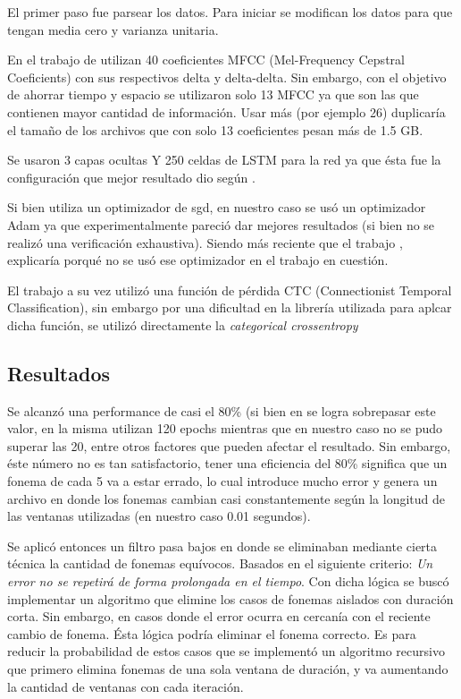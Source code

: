 \documentclass{article}
\begin{document}
El primer paso fue parsear los datos. Para iniciar se modifican los datos para que tengan media cero y varianza unitaria.

En el trabajo de \cite{RNN_HINTON} utilizan 40 coeficientes MFCC (Mel-Frequency Cepstral Coeficients) con sus respectivos delta y delta-delta. Sin embargo, con el objetivo de ahorrar tiempo y espacio se utilizaron solo 13 MFCC ya que son las que contienen mayor cantidad de información. Usar más (por ejemplo 26) duplicaría el tamaño de los archivos que con solo 13 coeficientes pesan más de 1.5 GB. 

Se usaron 3 capas ocultas Y 250 celdas de LSTM para la red ya que ésta fue la configuración que mejor resultado dio según \cite{RNN_HINTON}. 

Si bien \cite{RNN_HINTON} utiliza un optimizador de sgd, en nuestro caso se usó un optimizador Adam \cite{ADAM} ya que  experimentalmente pareció dar mejores resultados (si bien no se realizó una verificación exhaustiva). Siendo \cite{ADAM} más reciente que el trabajo \cite{RNN_HINTON}, explicaría porqué no se usó ese optimizador en el trabajo en cuestión. 

El trabajo a su vez utilizó una función de pérdida CTC (Connectionist Temporal Classification), sin embargo por una dificultad en la librería utilizada para aplcar dicha función, se utilizó directamente la \textit{categorical crossentropy}

\subsection*{Resultados}

Se alcanzó una performance de casi el 80\% (si bien en \cite{RNN_HINTON} se logra sobrepasar este valor, en la misma utilizan 120 epochs mientras que en nuestro caso no se pudo superar las 20, entre otros factores que pueden afectar el resultado. Sin embargo, éste número no es tan satisfactorio, tener una eficiencia del 80\% significa que un fonema de cada 5 va a estar errado, lo cual introduce mucho error y genera un archivo en donde los fonemas cambian casi constantemente según la longitud de las ventanas utilizadas (en nuestro caso 0.01 segundos).

Se aplicó entonces un filtro pasa bajos en donde se eliminaban mediante cierta técnica la cantidad de fonemas equívocos. Basados en el siguiente criterio: \textit{Un error no se repetirá de forma prolongada en el tiempo}. Con dicha lógica se buscó implementar un algoritmo que elimine los casos de fonemas aislados con duración corta. Sin embargo, en casos donde el error ocurra en cercanía con el reciente cambio de fonema. Ésta lógica podría eliminar el fonema correcto. Es para reducir la probabilidad de estos casos que se implementó un algoritmo recursivo que primero elimina fonemas de una sola ventana de duración, y va aumentando la cantidad de ventanas con cada iteración.
\end{document}
